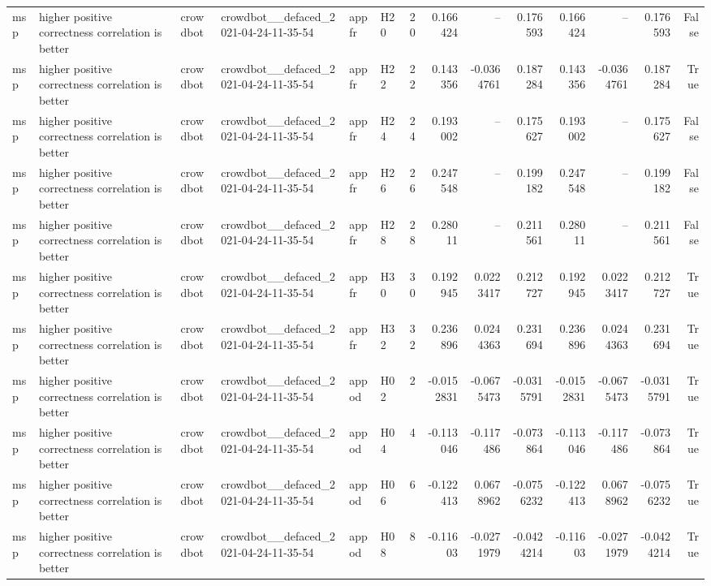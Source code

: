 \begin{longtable}{llllllrrrrrrrr}
msp & higher positive correctness correlation is better & crowdbot & crowdbot\_\_defaced\_2021-04-24-11-35-54 & appfr & H20 & 20 & 0.166424 & -- & 0.176593 & 0.166424 & -- & 0.176593 & False \\
msp & higher positive correctness correlation is better & crowdbot & crowdbot\_\_defaced\_2021-04-24-11-35-54 & appfr & H22 & 22 & 0.143356 & -0.0364761 & 0.187284 & 0.143356 & -0.0364761 & 0.187284 & True \\
msp & higher positive correctness correlation is better & crowdbot & crowdbot\_\_defaced\_2021-04-24-11-35-54 & appfr & H24 & 24 & 0.193002 & -- & 0.175627 & 0.193002 & -- & 0.175627 & False \\
msp & higher positive correctness correlation is better & crowdbot & crowdbot\_\_defaced\_2021-04-24-11-35-54 & appfr & H26 & 26 & 0.247548 & -- & 0.199182 & 0.247548 & -- & 0.199182 & False \\
msp & higher positive correctness correlation is better & crowdbot & crowdbot\_\_defaced\_2021-04-24-11-35-54 & appfr & H28 & 28 & 0.28011 & -- & 0.211561 & 0.28011 & -- & 0.211561 & False \\
msp & higher positive correctness correlation is better & crowdbot & crowdbot\_\_defaced\_2021-04-24-11-35-54 & appfr & H30 & 30 & 0.192945 & 0.0223417 & 0.212727 & 0.192945 & 0.0223417 & 0.212727 & True \\
msp & higher positive correctness correlation is better & crowdbot & crowdbot\_\_defaced\_2021-04-24-11-35-54 & appfr & H32 & 32 & 0.236896 & 0.0244363 & 0.231694 & 0.236896 & 0.0244363 & 0.231694 & True \\
msp & higher positive correctness correlation is better & crowdbot & crowdbot\_\_defaced\_2021-04-24-11-35-54 & appod & H02 & 2 & -0.0152831 & -0.0675473 & -0.0315791 & -0.0152831 & -0.0675473 & -0.0315791 & True \\
msp & higher positive correctness correlation is better & crowdbot & crowdbot\_\_defaced\_2021-04-24-11-35-54 & appod & H04 & 4 & -0.113046 & -0.117486 & -0.073864 & -0.113046 & -0.117486 & -0.073864 & True \\
msp & higher positive correctness correlation is better & crowdbot & crowdbot\_\_defaced\_2021-04-24-11-35-54 & appod & H06 & 6 & -0.122413 & 0.0678962 & -0.0756232 & -0.122413 & 0.0678962 & -0.0756232 & True \\
msp & higher positive correctness correlation is better & crowdbot & crowdbot\_\_defaced\_2021-04-24-11-35-54 & appod & H08 & 8 & -0.11603 & -0.0271979 & -0.0424214 & -0.11603 & -0.0271979 & -0.0424214 & True \\

\end{longtable}
